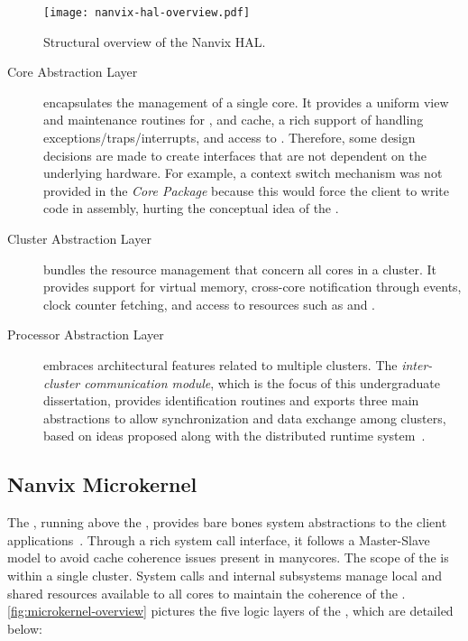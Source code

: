 		\begin{figure}[!tb]
			\centering%
			\caption{Structural overview of the Nanvix HAL.}%
			\label{fig:hal-overview}%
			\texttt{[image: nanvix-hal-overview.pdf]}%
		\end{figure}

		\begin{description}

			\item[Core Abstraction Layer]
				encapsulates the management of a single core.
				It provides a uniform view and maintenance routines for \tlbs, \mmu and cache,
				a rich support of handling exceptions/traps/interrupts, and
				access to \pmio.
				Therefore, some design decisions are made to create interfaces that are not
				dependent on the underlying hardware.
				For example, a context switch mechanism was not provided in the
				\textit{Core Package} because this would force the client \os
				to write code in assembly, hurting the conceptual idea of the \nanvixhal.

			\item[Cluster Abstraction Layer]
				bundles the resource management that concern all cores in a cluster.
				It provides support for virtual memory, cross-core notification through events,
				clock counter fetching, and access to \io resources such as \mmio and \dma.

			\item[Processor Abstraction Layer]
				embraces architectural features related to multiple clusters.
				The \textit{inter-cluster communication module}, which is the focus of
				this undergraduate dissertation, provides \noc identification routines and
				exports three main abstractions to allow synchronization and data
				exchange among clusters, based on ideas proposed along with the
				\nodeos distributed runtime system~\cite{DeDinechin2013-1}.

		\end{description}

	\subsection{Nanvix Microkernel}
	\label{sec.microkernel}

		The \textit{\nanvixmicrokernel}, running above the \nanvixhal, provides
		bare bones system abstractions to the client applications~\cite{penna:sbesc19}.
		Through a rich system call interface, it follows a Master-Slave \os model
		to avoid cache coherence issues present in manycores.
		The scope of the \nanvixmicrokernel is within a single cluster.
		System calls and internal subsystems manage local and shared resources
		available to all cores to maintain the coherence of the \os.
		\autoref{fig:microkernel-overview} pictures the five logic layers of the
		\nanvixmicrokernel, which are detailed below:

